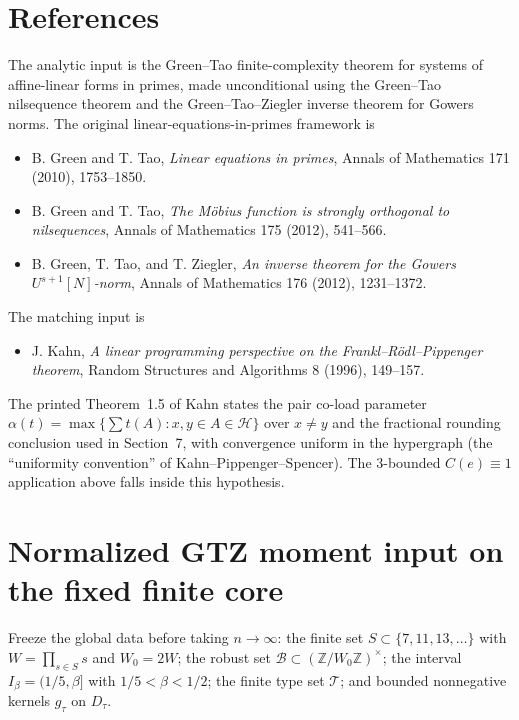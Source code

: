 \documentclass[11pt]{article}
\newcommand{\B}{\mathcal B}
\begin{document}
\section{References}

The analytic input is the Green--Tao finite-complexity theorem for systems of
affine-linear forms in primes, made unconditional using the Green--Tao
nilsequence theorem and the Green--Tao--Ziegler inverse theorem for Gowers
norms.  The original linear-equations-in-primes framework is

\begin{itemize}[leftmargin=*]
\item B. Green and T. Tao, \emph{Linear equations in primes}, Annals of
Mathematics 171 (2010), 1753--1850.
\item B. Green and T. Tao, \emph{The M\"obius function is strongly orthogonal
to nilsequences}, Annals of Mathematics 175 (2012), 541--566.
\item B. Green, T. Tao, and T. Ziegler, \emph{An inverse theorem for the
Gowers \(U^{s+1}[N]\)-norm}, Annals of Mathematics 176 (2012), 1231--1372.
\end{itemize}

The matching input is

\begin{itemize}[leftmargin=*]
\item J. Kahn, \emph{A linear programming perspective on the
Frankl--R\"odl--Pippenger theorem}, Random Structures and Algorithms 8
(1996), 149--157.
\end{itemize}

The printed Theorem~1.5 of Kahn states the pair co-load parameter
\(\alpha(t)=\max\{\sum t(A):x,y\in A\in\mathcal H\}\) over \(x\ne y\) and the
fractional rounding conclusion used in Section~7, with convergence uniform in
the hypergraph (the ``uniformity convention'' of Kahn--Pippenger--Spencer).
The 3-bounded \(C(e)\equiv 1\) application above falls inside this hypothesis.

\appendix
\section{Normalized GTZ moment input on the fixed finite core}

Freeze the global data before taking \(n\to\infty\): the finite set
\(S\subset\{7,11,13,\ldots\}\) with \(W=\prod_{s\in S}s\) and \(W_0=2W\); the
robust set \(\B\subset(\mathbb Z/W_0\mathbb Z)^\times\); the interval
\(I_\beta=(1/5,\beta]\) with \(1/5<\beta<1/2\); the finite type set
\(\mathcal T\); and bounded nonnegative kernels \(g_\tau\) on \(D_\tau\).
\end{document}
